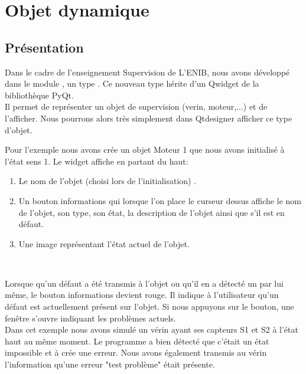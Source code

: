 
\chapter{Objet dynamique}

\section{Présentation}

Dans le cadre de l'enseignement Supervision de L'ENIB, nous avons développé dans le module , un type . Ce nouveau type hérite d'un Qwidget de la bibliothèque PyQt.\\

Il permet de représenter un objet de supervision (verin, moteur,...) et de l'afficher. Nous pourrons alors très simplement dans Qtdesigner afficher ce type d'objet.\\ 


Pour l'exemple nous avons crée un objet Moteur 1 que nous avons initialisé à l'état sens 1. 
Le widget affiche en partant du haut:
\begin{enumerate}
    \item Le nom de l'objet (choisi lors de l'initialisation) .
    \item Un bouton informations qui lorsque l'on place le curseur dessus affiche le nom de l'objet, son type, son état, la description de l'objet ainsi que s'il est en défaut.
    \item Une image représentant l'état actuel de l'objet.
\end{enumerate}\\


Lorsque qu'un défaut a été transmis à l'objet ou qu'il en a détecté un par lui même, le bouton informations devient rouge. Il indique à l'utilisateur qu'un défaut est actuellement présent sur l'objet. Si nous appuyons sur le bouton, une fenêtre s'ouvre indiquant les problèmes actuels. \\

Dans cet exemple nous avons simulé un vérin ayant ses capteurs S1 et S2 à l'état haut au même moment. Le programme a bien détecté que c'était un état impossible et à crée une erreur. Nous avons également transmis au vérin l'information qu'une erreur "test problème" était présente. 
 
